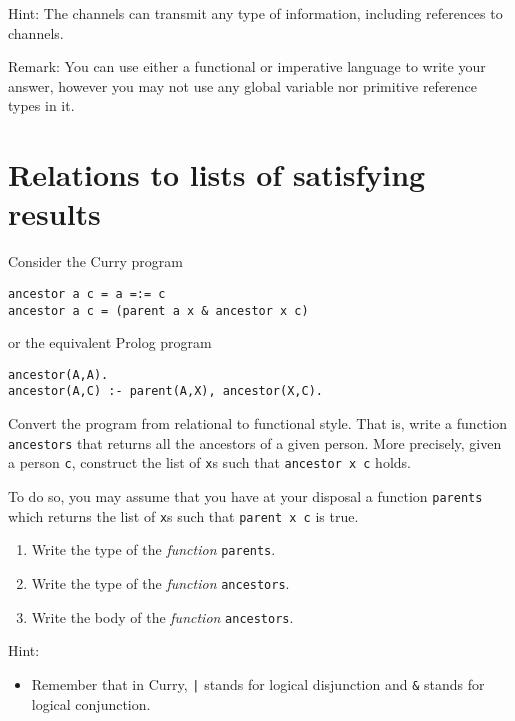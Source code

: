 \documentclass{article}
\newcommand{\answer}[1]{}
\begin{document}
Hint: The channels can transmit any type of information, including
references to channels.

Remark: You can use either a functional or imperative language to
write your answer, however you may not use any global variable nor
primitive reference types in it.

\answer{
\begin{verbatim}
data Command a = Get (Chan a) | Set a
type Variable a = Chan (Command a)

handler :: Variable a -> a -> IO ()
handler v a = do
  command <- readChan v
  case command of
    Set a' -> handler v a'
    Get c -> do
      writeChan c a
      handler v a

newVariable :: a -> IO (Variable a)
newVariable a = do
  c <- newChan
  forkIO (handler c a)
  return c

get :: Variable a -> IO a
get v = do
  c <- newChan
  writeChan v (Get c)
  readChan c

set :: Variable a -> a -> IO ()
set v a = do
  writeChan v (Set a)
\end{verbatim}
}

\newpage
\section{Relations to lists of satisfying results}

Consider the Curry program
\begin{verbatim}
ancestor a c = a =:= c
ancestor a c = (parent a x & ancestor x c)
\end{verbatim}
or the equivalent Prolog program
\begin{verbatim}
ancestor(A,A).
ancestor(A,C) :- parent(A,X), ancestor(X,C).
\end{verbatim}


Convert the program from relational to functional style. That is,
write a function \texttt{ancestors} that returns all the ancestors of
a given person.  More precisely, given a person \texttt{c}, construct the
list of \texttt{x}s such that \texttt{ancestor x c} holds.

To do so, you may assume that you have at your disposal a function
\texttt{parents} which returns the list of \texttt{x}s such that
\texttt{parent x c} is true.

\begin{enumerate}
\item Write the type of the \emph{function} \texttt{parents}. 
\item Write the type of the \emph{function} \texttt{ancestors}.
\item Write the body of the \emph{function} \texttt{ancestors}.
\end{enumerate}


Hint:
\begin{itemize}
\item Remember that in Curry, \texttt{|} stands for logical disjunction and
  \texttt{\&} stands for logical conjunction.
\end{itemize}
\end{document}

